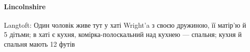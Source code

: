 \paragraph{Lincolnshire}

Langtoft: Один чоловік живе тут у хаті Wright’a з своєю дружиною,
її матір’ю й 5 дітьми; в хаті є кухня, комірка-полоскальний
над кухнею — спальня; кухня й спальня мають 12 футів
\parbreak{}  %
